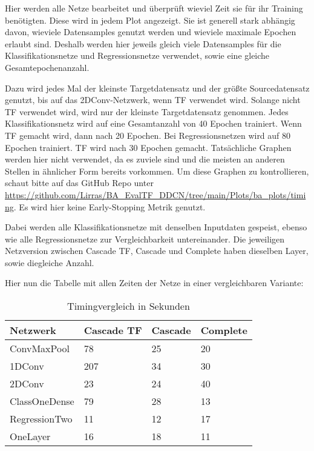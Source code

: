 Hier werden alle Netze bearbeitet und überprüft wieviel Zeit sie für ihr Training benötigten. 
Diese wird in jedem Plot angezeigt. Sie ist generell stark abhängig davon, wieviele Datensamples genutzt werden und 
wieviele maximale Epochen erlaubt sind. Deshalb werden hier jeweils gleich viele Datensamples für die Klassifikationsnetze und 
Regressionsnetze verwendet, sowie eine gleiche Gesamtepochenanzahl. 

Dazu wird jedes Mal der kleinste Targetdatensatz und der größte Sourcedatensatz genutzt, bis auf das 2DConv-Netzwerk, wenn TF verwendet wird. 
Solange nicht TF verwendet wird, wird nur der kleinste Targetdatensatz genommen. Jedes Klassifikationsnetz 
wird auf eine Gesamtanzahl von 40 Epochen trainiert. Wenn TF gemacht wird, dann nach 20 Epochen. Bei Regressionsnetzen wird auf 80 Epochen 
trainiert. TF wird nach 30 Epochen gemacht. Tatsächliche Graphen werden hier nicht verwendet, da es zuviele sind und die meisten an 
anderen Stellen in ähnlicher Form bereits vorkommen. Um diese Graphen zu kontrollieren, schaut bitte auf das GitHub Repo unter 
\url{https://github.com/Lirras/BA_EvalTF_DDCN/tree/main/Plots/ba_plots/timing}. 
Es wird hier keine Early-Stopping Metrik genutzt. 

Dabei werden alle Klassifikationsnetze mit denselben Inputdaten gespeist, ebenso wie alle Regressionsnetze zur Vergleichbarkeit untereinander. 
Die jeweiligen Netzversion zwischen Cascade TF, Cascade und Complete haben dieselben Layer, sowie diegleiche Anzahl. 

Hier nun die Tabelle mit allen Zeiten der Netze in einer vergleichbaren Variante: \newline

\begin{table}[h!]
    \begin{center}
        \caption{Timingvergleich in Sekunden}
        \label{tab:time}
        \begin{tabular}{l|l|l|l}
            \textbf{Netzwerk} & \textbf{Cascade TF} & \textbf{Cascade} & \textbf{Complete} \\
            \hline
            ConvMaxPool & 78 & 25 & 20 \\
            1DConv & 207 & 34 & 30 \\
            2DConv & 23 & 24 & 40 \\
            ClassOneDense & 79 & 28 & 13 \\
            RegressionTwo & 11 & 12 & 17 \\
            OneLayer & 16 & 18 & 11
        \end{tabular}
    \end{center}
\end{table}

